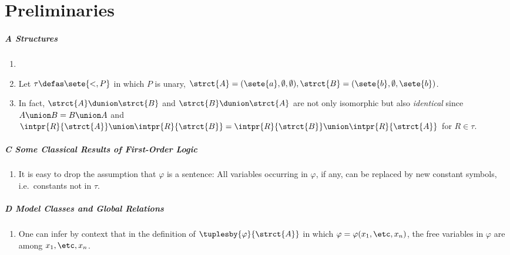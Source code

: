 \chapter{Preliminaries}
\paragraph{A Structures}
\begin{enumerate}[1.]
%
\item {}
%
\item {} Let $\tau \defas \sete{{<}, P}$ in which $P$ is unary, $\strct{A} = (\sete{a}, \emptyset, \emptyset), \strct{B} = (\sete{b}, \emptyset, \sete{b})$.
%
\item {} In fact, $\strct{A} \dunion \strct{B}$ and $\strct{B} \dunion \strct{A}$ are not only isomorphic but also \emph{identical} since $A \union B = B \union A$ and $\intpr{R}{\strct{A}} \union \intpr{R}{\strct{B}} = \intpr{R}{\strct{B}} \union \intpr{R}{\strct{A}}$ for $R \in \tau$.
%
\end{enumerate}
\paragraph{C Some Classical Results of First-Order Logic}
\begin{enumerate}[1.]
%
\item {} It is easy to drop the assumption that $\varphi$ is a sentence: All variables occurring in $\varphi$, if any, can be replaced by new constant symbols, i.e.\ constants not in $\tau$.
%
\end{enumerate}
\paragraph{D Model Classes and Global Relations}
\begin{enumerate}[1.]
%
\item {} One can infer by context that in the definition of $\tuplesby{\varphi}{\strct{A}}$ in which $\varphi = \varphi(x_1, \etc, x_n)$, the free variables in $\varphi$ are among $x_1, \etc, x_n$.
%
\end{enumerate}
